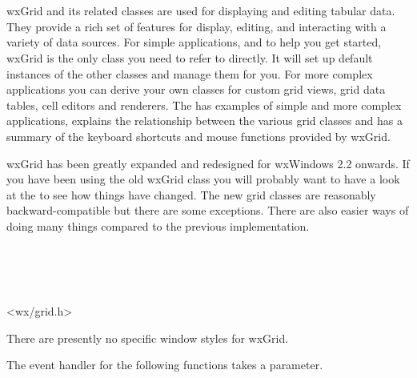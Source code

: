 \section{}\label{wxgrid}

wxGrid and its related classes are used for displaying and editing tabular
data. They provide a rich set of features for display, editing, and
interacting with a variety of data sources. For simple applications, and to
help you get started, wxGrid is the only class you need to refer to
directly. It will set up default instances of the other classes and manage
them for you. For more complex applications you can derive your own
classes for custom grid views, grid data tables, cell editors and
renderers. The  has
examples of simple and more complex applications, explains the
relationship between the various grid classes and has a summary of the
keyboard shortcuts and mouse functions provided by wxGrid.

wxGrid has been greatly expanded and redesigned for wxWindows 2.2
onwards. If you have been using the old wxGrid class you will probably
want to have a look at the  to see
how things have changed. The new grid classes are reasonably backward-compatible
but there are some exceptions. There are also easier ways of doing many things compared to
the previous implementation. 


\\
\\
\\


<wx/grid.h>


There are presently no specific window styles for wxGrid.




The event handler for the following functions takes a 
  parameter.

\twocolwidtha{7cm}
\begin{twocollist}\itemsep=0pt
\end{twocollist}%


